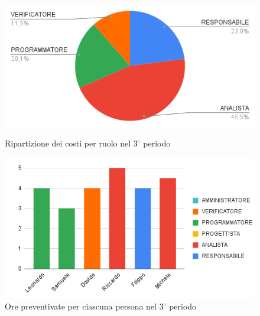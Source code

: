 \begin{figure}[H]
  \centering
  \includegraphics[width=0.6\linewidth]{grafici/3_periodo_torta.png}
  \caption{Ripartizione dei costi per ruolo nel $3^\circ$ periodo}
        \vspace{10mm}
  \includegraphics[width=0.7\linewidth]{grafici/3_periodo_istogramma.png}
  \caption{Ore preventivate per ciascuna persona nel $3^\circ$ periodo}
\end{figure}

